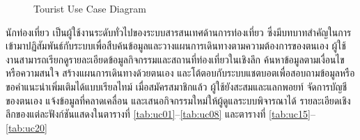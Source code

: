 \begin{figure}[H]
{%
}
\caption{Tourist Use Case Diagram}
\label{fig:usecase_tourist}
\end{figure}

นักท่องเที่ยว เป็นผู้ใช้งานระดับทั่วไปของระบบสารสนเทศด้านการท่องเที่ยว ซึ่งมีบทบาทสำคัญในการเข้ามาปฏิสัมพันธ์กับระบบเพื่อสืบค้นข้อมูลและวางแผนการเดินทางตามความต้องการของตนเอง ผู้ใช้งานสามารถเรียกดูรายละเอียดข้อมูลกิจกรรมและสถานที่ท่องเที่ยวในเชิงลึก ค้นหาข้อมูลตามเงื่อนไขหรือความสนใจ สร้างแผนการเดินทางด้วยตนเอง และโต้ตอบกับระบบแชตบอตเพื่อสอบถามข้อมูลหรือขอคำแนะนำเพิ่มเติมได้แบบเรียลไทม์ เมื่อสมัครสมาชิกแล้ว ผู้ใช้ยังสะสมและแลกพอยท์ จัดการบัญชีของตนเอง แจ้งข้อมูลที่คลาดเคลื่อน และเสนอกิจกรรมใหม่ให้ผู้ดูแลระบบพิจารณาได้ รายละเอียดเชิงลึกของแต่ละฟังก์ชันแสดงในตารางที่ \ref{tab:uc01}--\ref{tab:uc08} และตารางที่ \ref{tab:uc15}--\ref{tab:uc20}

